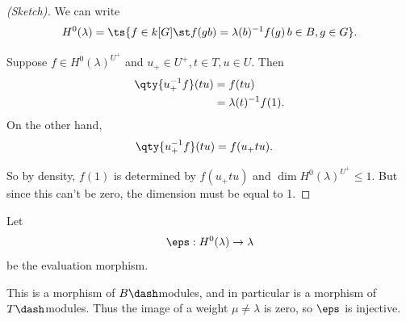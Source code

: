 \begin{proof}[(Sketch)]

We can write
\begin{align*}  
H^0(\lambda) = \ts{f\in k[G] \st f(gb) = \lambda(b)^{-1} f(g) \, b\in B, g\in G}
.\end{align*}

Suppose \(f\in H^0(\lambda)^{U^+}\) and \(u_+ \in U^+, t\in T, u\in U\).
Then
\begin{align*}  
\qty{ u_+^{-1} f} (tu) 
&= f(tu) \\
&= \lambda(t)^{-1} f(1)
.\end{align*} On the other hand,
\begin{align*}  
\qty{ u_+^{-1} f} (tu) 
&= f(u_+ t u)
.\end{align*}

So by density, \(f(1)\) is determined by \(f(u_+ t u)\) and
\(\dim H^0(\lambda)^{U^+} \leq 1\). But since this can't be zero, the
dimension must be equal to 1.

\end{proof}

\begin{proposition}[?]

Let
\begin{align*}  
\eps: H^0(\lambda) \to \lambda
\end{align*} be the evaluation morphism.

This is a morphism of \(B\dash\)modules, and in particular is a morphism
of \(T\dash\)modules. Thus the image of a weight \(\mu \neq \lambda\) is
zero, so \(\eps\) is injective.

\end{proposition}

